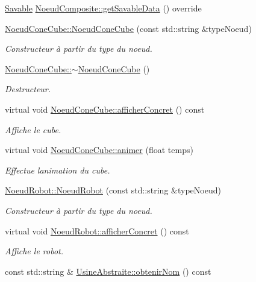 \begin{DoxyCompactItemize}
\item 
\hyperlink{class_savable}{Savable} \hyperlink{group__inf2990_ga3fefd2b70f384f82cb6319f468c01a63}{Noeud\+Composite\+::get\+Savable\+Data} () override
\item 
\hyperlink{group__inf2990_ga6f0bcd8b494e8aa6f3a8dad78bad2c0f}{Noeud\+Cone\+Cube\+::\+Noeud\+Cone\+Cube} (const std\+::string \&type\+Noeud)
\begin{DoxyCompactList}\small\item\em Constructeur à partir du type du noeud. \end{DoxyCompactList}\item 
\hyperlink{group__inf2990_ga8db4b36c3469001f7dcfab23debe7d2f}{Noeud\+Cone\+Cube\+::$\sim$\+Noeud\+Cone\+Cube} ()
\begin{DoxyCompactList}\small\item\em Destructeur. \end{DoxyCompactList}\item 
virtual void \hyperlink{group__inf2990_ga4b1f68c409f0b1c5eabd0be7822a36d2}{Noeud\+Cone\+Cube\+::afficher\+Concret} () const 
\begin{DoxyCompactList}\small\item\em Affiche le cube. \end{DoxyCompactList}\item 
\hypertarget{group__inf2990_ga3472a200d45ce3cdff72d72921807b21}{}virtual void \hyperlink{group__inf2990_ga3472a200d45ce3cdff72d72921807b21}{Noeud\+Cone\+Cube\+::animer} (float temps)\label{group__inf2990_ga3472a200d45ce3cdff72d72921807b21}

\begin{DoxyCompactList}\small\item\em Effectue l\textquotesingle{}animation du cube. \end{DoxyCompactList}\item 
\hyperlink{group__inf2990_ga147453ac7f72970d7d9bfe336998ad94}{Noeud\+Robot\+::\+Noeud\+Robot} (const std\+::string \&type\+Noeud)
\begin{DoxyCompactList}\small\item\em Constructeur à partir du type du noeud. \end{DoxyCompactList}\item 
virtual void \hyperlink{group__inf2990_gad63a8e09cc5ca8cc349f35e0901474e2}{Noeud\+Robot\+::afficher\+Concret} () const 
\begin{DoxyCompactList}\small\item\em Affiche le robot. \end{DoxyCompactList}\item 
\hypertarget{group__inf2990_gad39877ea31a37efc3e58708193155c3c}{}const std\+::string \& \hyperlink{group__inf2990_gad39877ea31a37efc3e58708193155c3c}{Usine\+Abstraite\+::obtenir\+Nom} () const \label{group__inf2990_gad39877ea31a37efc3e58708193155c3c}


\end{DoxyCompactItemize}
